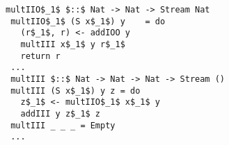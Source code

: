 \begin{minipage}{0.52\columnwidth}
  \begin{lstlisting}[frame=tb]
 multIIO$_1$ $::$ Nat -> Nat -> Stream Nat
 multIIO$_1$ (S x$_1$) y    = do
   (r$_1$, r) <- addIOO y
   multIII x$_1$ y r$_1$
   return r
 ...
 multIII $::$ Nat -> Nat -> Nat -> Stream ()
 multIII (S x$_1$) y z = do
   z$_1$ <- multIIO$_1$ x$_1$ y
   addIII y z$_1$ z
 multIII _ _ _ = Empty
 ...
\end{lstlisting}
\end{minipage}
